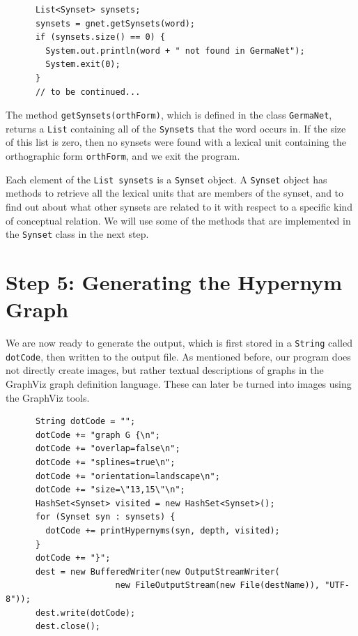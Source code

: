 \documentclass[12pt,a4paper,english,utf8]{report}
\begin{document}
\begin{lstlisting}
      List<Synset> synsets;
      synsets = gnet.getSynsets(word);
      if (synsets.size() == 0) {
        System.out.println(word + " not found in GermaNet");
        System.exit(0);
      }
      // to be continued...
\end{lstlisting}

\begin{sloppypar}
The method \texttt{getSynsets(orthForm)}, which is defined in the class \texttt{GermaNet}, returns a \texttt{List} containing all of the \texttt{Synsets} that the word occurs in. If the size of this list is zero, then no synsets were found with a lexical unit containing the orthographic form \texttt{orthForm}, and we exit the program.
\end{sloppypar}

Each element of the \texttt{List synsets} is a \texttt{Synset} object. A \texttt{Synset} object has methods to retrieve all the lexical units that are members of the synset, and to find out about what other synsets are related to it with respect to a specific kind of conceptual relation. We will use some of the methods that are implemented in the \texttt{Synset} class in the next step.



\section{Step 5: Generating the Hypernym Graph}
We are now ready to generate the output, which is first stored in a \texttt{String} called \texttt{dotCode}, then written to the output file. As mentioned before, our program does not directly create images, but rather textual descriptions of graphs in the GraphViz graph definition language. These can later be turned into images using the GraphViz tools.

\begin{lstlisting}
      String dotCode = "";
      dotCode += "graph G {\n";
      dotCode += "overlap=false\n";
      dotCode += "splines=true\n";
      dotCode += "orientation=landscape\n";
      dotCode += "size=\"13,15\"\n";
      HashSet<Synset> visited = new HashSet<Synset>();
      for (Synset syn : synsets) {
        dotCode += printHypernyms(syn, depth, visited);
      }
      dotCode += "}";
      dest = new BufferedWriter(new OutputStreamWriter(
                      new FileOutputStream(new File(destName)), "UTF-8"));
      dest.write(dotCode);
      dest.close();

\end{lstlisting}
\end{document}
